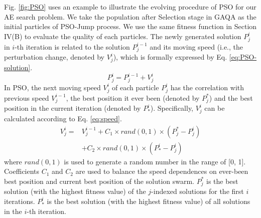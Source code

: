 \documentclass[lettersize,journal]{IEEEtran}
\begin{document}
	Fig. \ref{fig:PSO} uses an example to illustrate the evolving procedure of PSO for our AE search problem. We take the population after Selection stage in GAQA as the initial particles of PSO-Jump process. We use the same fitness function in Section IV(B) to evaluate the quality of each particles. The newly generated solution $P^i_j$ in $i$-th iteration is related to the solution $P^{i-1}_j$ and its moving speed (i.e., the perturbation change, denoted by $V^i_j$), which is formally expressed by Eq. \ref{eq:PSO-solution}.  
	\begin{equation}
		\label{eq:PSO-solution}
		P^i_j = P^{i-1}_j + V^i_j
	\end{equation}
	In PSO, the next moving speed $V^i_j$ of each particle $P^i_j$ has the correlation with previous speed $V^{i-1}_j$, the best position it ever been (denoted by $P^*_j$) and the best position in the current iteration (denoted by $P^i_*$). Specifically,  $V^i_j$ can be calculated according to Eq. \ref{eq:speed}.
	\begin{equation}
		\label{eq:speed}
		\begin{split}
			V^i_j= &V^{i-1}_j+C_1 \times rand(0, 1) \times (P^*_j-P^i_j) \\ 
			&+ C_2 \times rand(0, 1) \times (P^i_*-P^i_j)
		\end{split}
	\end{equation}  
	where $rand(0, 1)$ is used to generate a random number in the range of [0, 1]. Coefficients $C_1$ and $C_2$ are used to balance the speed dependences on ever-been best position and current best position of the solution swarm. $P^*_j$ is the best solution (with the highest fitness value) of the $j$-indexed solutions for the first $i$ iterations.  $P^i_*$ is the best solution (with the highest fitness value) of all solutions in the $i$-th iteration.   
	
\end{document}
